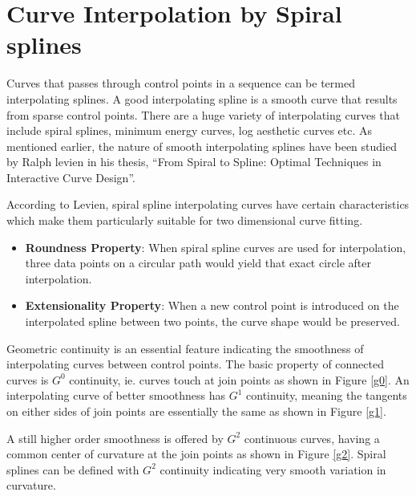 \documentclass[11pt,twoside,a4paper,parskip=half]{scrartcl}
\begin{document}
 
\clearpage

\section{Curve Interpolation by Spiral splines}

Curves that passes through control points in a sequence can be termed interpolating splines. A good interpolating spline is a smooth curve that results from sparse control points. There are a huge variety of interpolating curves that include spiral splines, minimum energy curves, log aesthetic curves etc. As mentioned earlier, the nature of smooth interpolating splines have been studied by Ralph levien in his thesis, ``From Spiral to Spline: Optimal Techniques in Interactive Curve Design”\cite{levien}.

According to Levien, spiral spline interpolating curves have certain characteristics which make them particularly suitable for two dimensional curve fitting.
\begin{itemize}
	
	\item \textbf{Roundness Property}: When spiral spline curves are used for interpolation, three data points on a circular path would yield that exact circle after interpolation.
	\item \textbf{Extensionality Property}: When a new control point is introduced on the interpolated spline between two points, the curve shape would be preserved.
\end{itemize}

Geometric continuity is an essential feature indicating the smoothness of interpolating curves between control points. The basic property of connected curves is $G^0$ continuity, ie. curves touch at join points as shown in Figure \ref{g0}. An interpolating curve of better smoothness has $G^1$ continuity, meaning the tangents on either sides of join points are essentially the same as shown in Figure \ref{g1}. 

A still higher order smoothness is offered by $G^2$ continuous curves, having a common center of curvature at the join points as shown in Figure \ref{g2}. Spiral splines can be defined with $G^2$ continuity indicating very smooth variation in curvature. 
\end{document}
